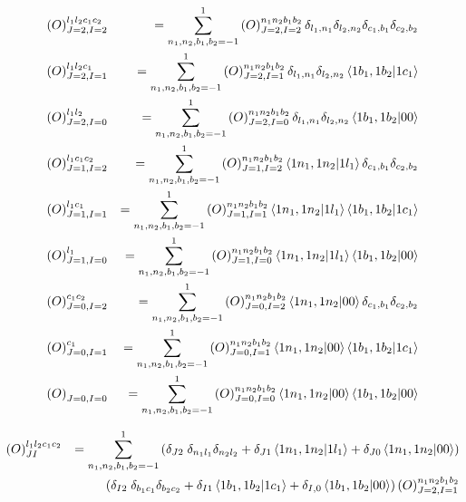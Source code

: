 \documentclass{article}
\newcommand{\bea}{\begin{eqnarray}}
\newcommand{\eea}{\end{eqnarray}}
\begin{document}
\bea 
\left(O\right)^{l_1 l_2 c_1 c_2}_{J=2,I=2} &&= \sum_{n_1,n_2,b_1,b_2=-1}^{1}\left(O\right)^{n_1 n_2 b_1 b_2}_{J=2,I=2}\delta_{l_1,n_1}\delta_{l_2,n_2}\delta_{c_1,b_1}\delta_{c_2,b_2}\nonumber \\
\left(O\right)^{l_1 l_2 c_1}_{J=2,I=1} &&= \sum_{n_1,n_2,b_1,b_2=-1}^{1}\left(O\right)^{n_1 n_2 b_1 b_2}_{J=2,I=1}\delta_{l_1,n_1}\delta_{l_2,n_2}\bra{1b_1,1b_2}\ket{1c_1} \nonumber \\
\left(O\right)^{l_1 l_2}_{J=2,I=0} &&= \sum_{n_1,n_2,b_1,b_2=-1}^{1}\left(O\right)^{n_1 n_2 b_1 b_2}_{J=2,I=0}\delta_{l_1,n_1}\delta_{l_2,n_2}\bra{1b_1,1b_2}\ket{00} \nonumber \\
\left(O\right)^{l_1 c_1 c_2}_{J=1,I=2} &&= \sum_{n_1,n_2,b_1,b_2=-1}^{1}\left(O\right)^{n_1 n_2 b_1 b_2}_{J=1,I=2}\bra{1n_1,1n_2}\ket{1l_1} \delta_{c_1,b_1}\delta_{c_2,b_2} \nonumber \\
\left(O\right)^{l_1 c_1}_{J=1,I=1} &&= \sum_{n_1,n_2,b_1,b_2=-1}^{1}\left(O\right)^{n_1 n_2 b_1 b_2}_{J=1,I=1}\bra{1n_1,1n_2}\ket{1l_1} \bra{1b_1,1b_2}\ket{1c_1} \nonumber \\
\left(O\right)^{l_1}_{J=1,I=0} &&= \sum_{n_1,n_2,b_1,b_2=-1}^{1}\left(O\right)^{n_1 n_2 b_1 b_2}_{J=1,I=0}\bra{1n_1,1n_2}\ket{1l_1} \bra{1b_1,1b_2}\ket{00} \nonumber \\
\left(O\right)^{ c_1 c_2}_{J=0,I=2} &&= \sum_{n_1,n_2,b_1,b_2=-1}^{1}\left(O\right)^{n_1 n_2 b_1 b_2}_{J=0,I=2}\bra{1n_1,1n_2}\ket{00} \delta_{c_1,b_1}\delta_{c_2,b_2} \nonumber \\
\left(O\right)^{c_1 }_{J=0,I=1} &&= \sum_{n_1,n_2,b_1,b_2=-1}^{1}\left(O\right)^{n_1 n_2 b_1 b_2}_{J=0,I=1}\bra{1n_1,1n_2}\ket{00} \bra{1b_1,1b_2}\ket{1c_1}  \nonumber \\
\left(O\right)^{ }_{J=0,I=0} &&= \sum_{n_1,n_2,b_1,b_2=-1}^{1}\left(O\right)^{n_1 n_2 b_1 b_2}_{J=0,I=0}\bra{1n_1,1n_2}\ket{00} \bra{1b_1,1b_2}\ket{00}  \nonumber 
\eea

\bea
\left(O\right)^{l_1 l_2 c_1 c_2}_{JI} &&= \sum_{n_1,n_2,b_1,b_2=-1}^{1} \left(\delta_{J2}\;\delta_{n_1 l_1}\delta_{n_2 l_2} +  \delta_{J1}\bra{1n_1,1n_2}\ket{1l_1}+  \delta_{J0}\bra{1n_1,1n_2}\ket{00} \right) \nonumber\\
&&\left(\delta_{I2}\; \delta_{b_1 c_1}\delta_{b_2 c_2} +  \delta_{I1}\bra{1b_1,1b_2}\ket{1c_1}+  \delta_{I,0}\bra{1b_1,1b_2}\ket{00} \right)  \left(O\right)^{n_1 n_2 b_1 b_2}_{J=2,I=1}\nonumber 
\eea






\vspace{50mm}
\end{document}
